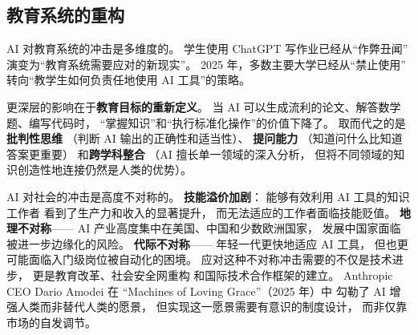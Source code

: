 \subsection{教育系统的重构}

AI 对教育系统的冲击是多维度的。
学生使用 ChatGPT 写作业已经从“作弊丑闻”
演变为“教育系统需要应对的新现实”。
2025 年，多数主要大学已经从“禁止使用”
转向“教学生如何负责任地使用 AI 工具”的策略。

更深层的影响在于\textbf{教育目标的重新定义}。
当 AI 可以生成流利的论文、解答数学题、编写代码时，
“掌握知识”和“执行标准化操作”的价值下降了。
取而代之的是\textbf{批判性思维}
（判断 AI 输出的正确性和适当性）、
\textbf{提问能力}
（知道问什么比知道答案更重要）
和\textbf{跨学科整合}
（AI 擅长单一领域的深入分析，
但将不同领域的知识创造性地连接仍然是人类的优势）。

\begin{warnbox}
AI 对社会的冲击是高度不对称的。
\textbf{技能溢价加剧}：
能够有效利用 AI 工具的知识工作者
看到了生产力和收入的显著提升，
而无法适应的工作者面临技能贬值。
\textbf{地理不对称}——
AI 产业高度集中在美国、中国和少数欧洲国家，
发展中国家面临被进一步边缘化的风险。
\textbf{代际不对称}——
年轻一代更快地适应 AI 工具，
但也更可能面临入门级岗位被自动化的困境。
应对这种不对称冲击需要的不仅是技术进步，
更是教育改革、社会安全网重构
和国际技术合作框架的建立。
Anthropic CEO Dario Amodei 在
“Machines of Loving Grace”（2025 年）中
勾勒了 AI 增强人类而非替代人类的愿景，
但实现这一愿景需要有意识的制度设计，
而非仅靠市场的自发调节。
\end{warnbox}

